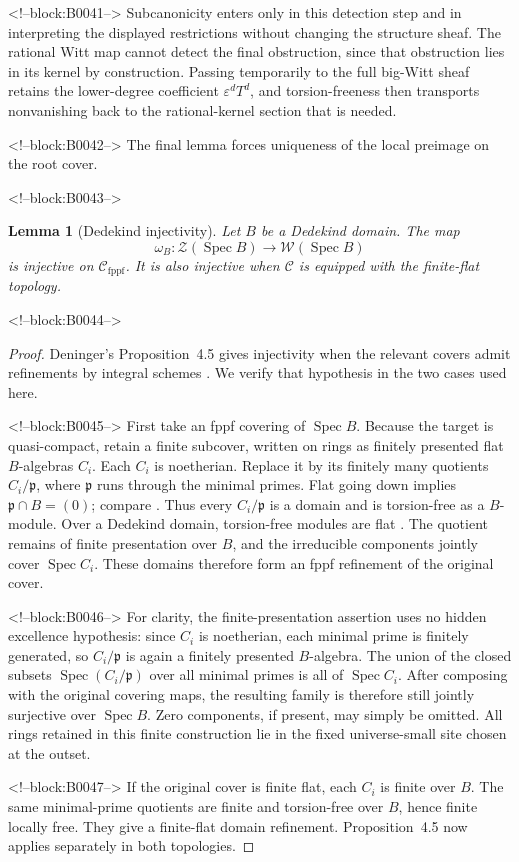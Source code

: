 \documentclass[11pt]{article}
\newtheorem{lemma}[theorem]{Lemma}
\theoremstyle{definition}
\newcommand{\Spec}{\operatorname{Spec}}
\newcommand{\Zsh}{\mathcal Z}
\newcommand{\Wsh}{\mathcal W}
\newcommand{\fppf}{\mathrm{fppf}}
\begin{document}
<!--block:B0041-->
Subcanonicity enters only in this detection step and in interpreting the
displayed restrictions without changing the structure sheaf.  The
rational Witt map cannot detect the final obstruction, since that
obstruction lies in its kernel by construction.  Passing temporarily to
the full big-Witt sheaf retains the lower-degree coefficient
\(\varepsilon^dT^d\), and torsion-freeness then transports nonvanishing
back to the rational-kernel section that is needed.

<!--block:B0042-->
The final lemma forces uniqueness of the local preimage on the root cover.

<!--block:B0043-->
\begin{lemma}[Dedekind injectivity]\label{lem:dedekind}
Let \(B\) be a Dedekind domain.  The map
\[
 \omega_B\colon\Zsh(\Spec B)\longrightarrow\Wsh(\Spec B)
\]
is injective on \(\mathscr C_{\fppf}\).  It is also injective when
\(\mathscr C\) is equipped with the finite-flat topology.
\end{lemma}

<!--block:B0044-->
\begin{proof}
Deninger's Proposition~4.5 gives injectivity when the relevant covers admit
refinements by integral schemes
\cite[Prop.~4.5, pp.~22--23]{Deninger2025Rational}.  We verify that
hypothesis in the two cases used here.

<!--block:B0045-->
First take an fppf covering of \(\Spec B\).  Because the target is
quasi-compact, retain a finite subcover, written on rings as finitely
presented flat \(B\)-algebras \(C_i\).  Each \(C_i\) is noetherian.
Replace it by its finitely many quotients \(C_i/\mathfrak p\), where
\(\mathfrak p\) runs through the minimal primes.  Flat going down implies
\(\mathfrak p\cap B=(0)\); compare
\cite[Tag 00HS]{StacksProject}.  Thus every \(C_i/\mathfrak p\) is a
domain and is torsion-free as a \(B\)-module.  Over a Dedekind domain,
torsion-free modules are flat
\cite[Tag 0AUW]{StacksProject}.  The quotient remains of finite
presentation over \(B\), and the irreducible components jointly cover
\(\Spec C_i\).  These domains therefore form an fppf refinement of the
original cover.

<!--block:B0046-->
For clarity, the finite-presentation assertion uses no hidden excellence
hypothesis: since \(C_i\) is noetherian, each minimal prime is finitely
generated, so \(C_i/\mathfrak p\) is again a finitely presented
\(B\)-algebra.  The union of the closed subsets
\(\Spec(C_i/\mathfrak p)\) over all minimal primes is all of
\(\Spec C_i\).  After composing with the original covering maps, the
resulting family is therefore still jointly surjective over \(\Spec B\).
Zero components, if present, may simply be omitted.
All rings retained in this finite construction lie in the fixed
universe-small site chosen at the outset.

<!--block:B0047-->
If the original cover is finite flat, each \(C_i\) is finite over \(B\).
The same minimal-prime quotients are finite and torsion-free over \(B\),
hence finite locally free.  They give a finite-flat domain refinement.
Proposition~4.5 now applies separately in both topologies.
\end{proof}
\end{document}
